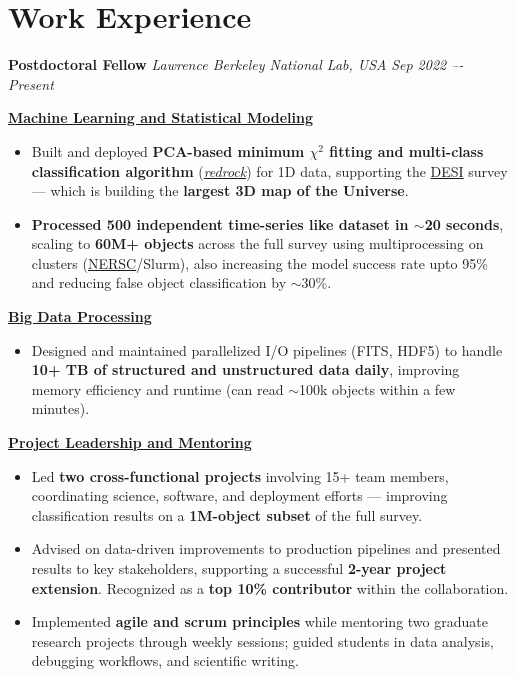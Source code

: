 \documentclass[a4paper,10pt]{article}
\begin{document}
\section*{Work Experience}
\textcolor{sectionblue}{\textbf{Postdoctoral Fellow}} \hfill 
\textcolor{sectionblue}{\textit{Lawrence Berkeley National Lab, USA}} \hfill 
\textcolor{sectionblue}{\textit{Sep 2022 –- Present}}
\vspace{1.5mm}
\begin{adjustwidth}{1em}{0pt}

\textbf{\textcolor{sectionblue}{\underline{Machine Learning and Statistical Modeling}}}
\begin{itemize}[leftmargin=*, itemsep=2pt]
    \item Built and deployed \textbf{PCA-based minimum $\chi^2$ fitting and multi-class classification algorithm} (\href{https://github.com/desihub/redrock}{\textit{redrock}}) for 1D data, supporting the \href{https://en.wikipedia.org/wiki/Dark_Energy_Spectroscopic_Instrument}{DESI} survey — which is building the \textbf{largest 3D map of the Universe}.
    \vspace{-0.5mm}
    \item \textbf{Processed 500 independent time-series like dataset in $\sim$20 seconds}, scaling to \textbf{60M+ objects} across the full survey using multiprocessing on clusters (\href{https://www.nersc.gov/}{NERSC}/Slurm), also increasing the model success rate upto 95\% and reducing false object classification by $\sim$30\%.
\end{itemize}
\vspace{-1pt}
\textcolor{sectionblue}{\textbf{\underline{Big Data Processing}}}
\begin{itemize}[leftmargin=*, itemsep=2pt]
    \item Designed and maintained parallelized I/O pipelines (FITS, HDF5) to handle \textbf{10+ TB of structured and unstructured data daily}, improving memory efficiency and runtime (can read $\sim$100k objects within a few minutes).
\end{itemize}
\vspace{-0.5pt}
\textcolor{sectionblue}{\textbf{\underline{Project Leadership and Mentoring}}}
\begin{itemize}[leftmargin=*, itemsep=2pt]
    \item Led \textbf{two cross-functional projects} involving 15+ team members, coordinating science, software, and deployment efforts — improving classification results on a \textbf{1M-object subset} of the full survey.
     \vspace{-0.5mm}
    \item Advised on data-driven improvements to production pipelines and presented results to key stakeholders, supporting a successful \textbf{2-year project extension}. Recognized as a \textbf{top 10\% contributor} within the collaboration.
    \item Implemented \textbf{agile and scrum principles} while mentoring two graduate research projects through weekly sessions; guided students in data analysis, debugging workflows, and scientific writing.

\end{itemize}
\end{adjustwidth}
\end{document}
